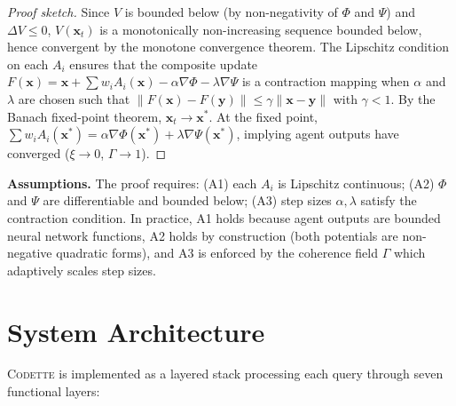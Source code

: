 \documentclass[11pt,a4paper]{article}
\newcommand{\codette}{\textsc{Codette}}
\begin{document}
\begin{proof}[Proof sketch]
Since $V$ is bounded below (by non-negativity of $\Phi$ and $\Psi$) and $\Delta V \leq 0$, $V(\mathbf{x}_t)$ is a monotonically non-increasing sequence bounded below, hence convergent by the monotone convergence theorem. The Lipschitz condition on each $A_i$ ensures that the composite update $F(\mathbf{x}) = \mathbf{x} + \sum w_i A_i(\mathbf{x}) - \alpha\nabla\Phi - \lambda\nabla\Psi$ is a contraction mapping when $\alpha$ and $\lambda$ are chosen such that $\|F(\mathbf{x}) - F(\mathbf{y})\| \leq \gamma \|\mathbf{x} - \mathbf{y}\|$ with $\gamma < 1$. By the Banach fixed-point theorem, $\mathbf{x}_t \to \mathbf{x}^*$. At the fixed point, $\sum w_i A_i(\mathbf{x}^*) = \alpha\nabla\Phi(\mathbf{x}^*) + \lambda\nabla\Psi(\mathbf{x}^*)$, implying agent outputs have converged ($\xi \to 0$, $\Gamma \to 1$).
\end{proof}

\textbf{Assumptions.} The proof requires: (A1) each $A_i$ is Lipschitz continuous; (A2) $\Phi$ and $\Psi$ are differentiable and bounded below; (A3) step sizes $\alpha, \lambda$ satisfy the contraction condition. In practice, A1 holds because agent outputs are bounded neural network functions, A2 holds by construction (both potentials are non-negative quadratic forms), and A3 is enforced by the coherence field $\Gamma$ which adaptively scales step sizes.

\section{System Architecture}
\label{sec:architecture}

\codette{} is implemented as a layered stack processing each query through seven functional layers:
\end{document}
